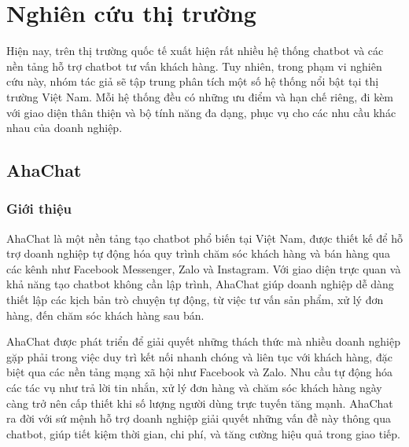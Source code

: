 \section{Nghiên cứu thị trường}

Hiện nay, trên thị trường quốc tế xuất hiện rất nhiều hệ thống chatbot và các nền tảng hỗ trợ chatbot tư vấn khách hàng. Tuy nhiên, trong phạm vi nghiên cứu này, nhóm tác giả sẽ tập trung phân tích một số hệ thống nổi bật tại thị trường Việt Nam. Mỗi hệ thống đều có những ưu điểm và hạn chế riêng, đi kèm với giao diện thân thiện và bộ tính năng đa dạng, phục vụ cho các nhu cầu khác nhau của doanh nghiệp.
\subsection{AhaChat}
\subsubsection{Giới thiệu}
AhaChat là một nền tảng tạo chatbot phổ biến tại Việt Nam, được thiết kế để hỗ trợ doanh nghiệp tự động hóa quy trình chăm sóc khách hàng và bán hàng qua các kênh như Facebook Messenger, Zalo và Instagram. Với giao diện trực quan và khả năng tạo chatbot không cần lập trình, AhaChat giúp doanh nghiệp dễ dàng thiết lập các kịch bản trò chuyện tự động, từ việc tư vấn sản phẩm, xử lý đơn hàng, đến chăm sóc khách hàng sau bán.

AhaChat được phát triển để giải quyết những thách thức mà nhiều doanh nghiệp gặp phải trong việc duy trì kết nối nhanh chóng và liên tục với khách hàng, đặc biệt qua các nền tảng mạng xã hội như Facebook và Zalo. Nhu cầu tự động hóa các tác vụ như trả lời tin nhắn, xử lý đơn hàng và chăm sóc khách hàng ngày càng trở nên cấp thiết khi số lượng người dùng trực tuyến tăng mạnh. AhaChat ra đời với sứ mệnh hỗ trợ doanh nghiệp giải quyết những vấn đề này thông qua chatbot, giúp tiết kiệm thời gian, chi phí, và tăng cường hiệu quả trong giao tiếp.

